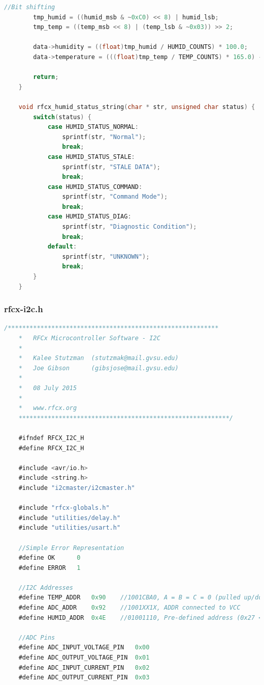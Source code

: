 \documentclass{article}
\numberwithin{figure}{section}
\numberwithin{equation}{section}
\begin{document}
{\begin{lstlisting}[language=C,label=lst:rfcx-i2c.c,caption=rfcx-i2c.c]
        //Bit shifting
        tmp_humid = ((humid_msb & ~0xC0) << 8) | humid_lsb;
        tmp_temp = ((temp_msb << 8) | (temp_lsb & ~0x03)) >> 2;

        data->humidity = ((float)tmp_humid / HUMID_COUNTS) * 100.0;
        data->temperature = (((float)tmp_temp / TEMP_COUNTS) * 165.0) - 40.0;

        return;
    }

    void rfcx_humid_status_string(char * str, unsigned char status) {
        switch(status) {
            case HUMID_STATUS_NORMAL:
                sprintf(str, "Normal");
                break;
            case HUMID_STATUS_STALE:
                sprintf(str, "STALE DATA");
                break;
            case HUMID_STATUS_COMMAND:
                sprintf(str, "Command Mode");
                break;
            case HUMID_STATUS_DIAG:
                sprintf(str, "Diagnostic Condition");
                break;
            default:
                sprintf(str, "UNKNOWN");
                break;
        }
    }
\end{lstlisting}

\subsubsection{rfcx-i2c.h}\label{sect:rfcx-i2c.h}
\begin{lstlisting}[language=C,label=lst:rfcx-i2c.h,caption=rfcx-i2c.h]
    /**********************************************************
    *	RFCx Microcontroller Software - I2C
    *
    *	Kalee Stutzman 	(stutzmak@mail.gvsu.edu)
    *	Joe Gibson		(gibsjose@mail.gvsu.edu)
    *
    *	08 July 2015
    *
    *   www.rfcx.org
    **********************************************************/

    #ifndef RFCX_I2C_H
    #define RFCX_I2C_H

    #include <avr/io.h>
    #include <string.h>
    #include "i2cmaster/i2cmaster.h"

    #include "rfcx-globals.h"
    #include "utilities/delay.h"
    #include "utilities/usart.h"

    //Simple Error Representation
    #define OK      0
    #define ERROR   1

    //I2C Addresses
    #define TEMP_ADDR   0x90    //1001CBA0, A = B = C = 0 (pulled up/down in hardware)
    #define ADC_ADDR    0x92    //1001XX1X, ADDR connected to VCC
    #define HUMID_ADDR  0x4E    //01001110, Pre-defined address (0x27 << 1)

    //ADC Pins
    #define ADC_INPUT_VOLTAGE_PIN   0x00
    #define ADC_OUTPUT_VOLTAGE_PIN  0x01
    #define ADC_INPUT_CURRENT_PIN   0x02
    #define ADC_OUTPUT_CURRENT_PIN  0x03


\end{lstlisting}}
\end{document}
